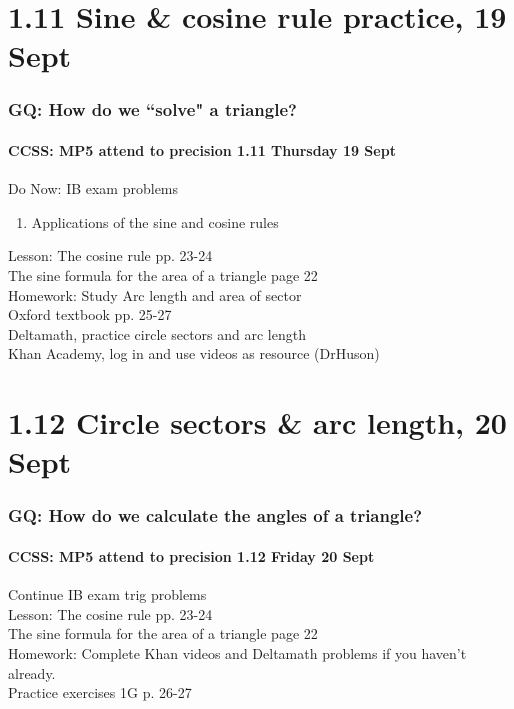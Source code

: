 \documentclass{beamer}
\begin{document}
  \section{1.11 Sine \& cosine rule practice, 19 Sept}
  \frame
  {
    \frametitle{GQ: How do we ``solve" a triangle?}
    \framesubtitle{CCSS: MP5 attend to precision \hfill \alert{1.11 Thursday 19 Sept}}

    \begin{block}{Do Now: IB exam problems}
    \begin{enumerate}
        \item Applications of the sine and cosine rules
    \end{enumerate}
    \end{block}
    Lesson: The cosine rule pp. 23-24\\
    The sine formula for the area of a triangle page 22\\ \smallskip
    Homework: Study Arc length and area of sector \\
    Oxford textbook pp. 25-27 \\
    Deltamath, practice circle sectors and arc length \\
    Khan Academy, log in and use videos as resource (DrHuson)
  }

  \section{1.12 Circle sectors \& arc length, 20 Sept}
  \frame
  {
    \frametitle{GQ: How do we calculate the angles of a triangle?}
    \framesubtitle{CCSS: MP5 attend to precision \hfill \alert{1.12 Friday 20 Sept}}

    Continue IB exam trig problems \\ \bigskip
    Lesson: The cosine rule pp. 23-24\\
    The sine formula for the area of a triangle page 22\\ \smallskip
    Homework: Complete Khan videos and Deltamath problems if you haven't already. \\
    Practice exercises 1G p. 26-27
  }
\end{document}
